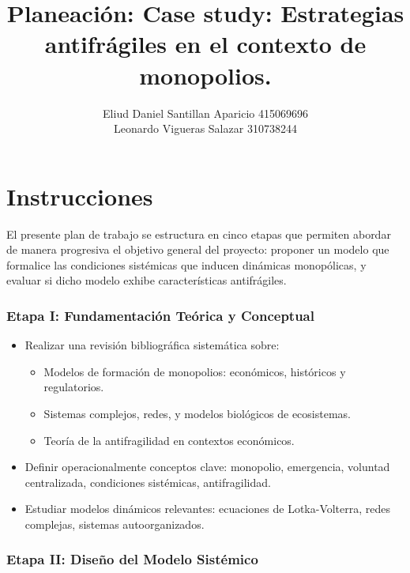 \documentclass[a4paper,12pt]{article}
\title{\textbf{Planeación:} Case study: Estrategias antifrágiles en el contexto de monopolios.}
\author{Eliud Daniel Santillan Aparicio 415069696 \\ Leonardo Vigueras Salazar 310738244}
\date{} %
\begin{document}
\maketitle
\section*{Instrucciones}

El presente plan de trabajo se estructura en cinco etapas que permiten abordar de manera progresiva el objetivo general del proyecto: proponer un modelo que formalice las condiciones sistémicas que inducen dinámicas monopólicas, y evaluar si dicho modelo exhibe características antifrágiles.

\subsubsection*{Etapa I: Fundamentación Teórica y Conceptual}

\begin{itemize}
    \item Realizar una revisión bibliográfica sistemática sobre:
    \begin{itemize}
        \item Modelos de formación de monopolios: económicos, históricos y regulatorios.
        \item Sistemas complejos, redes, y modelos biológicos de ecosistemas.
        \item Teoría de la antifragilidad en contextos económicos.
    \end{itemize}
    \item Definir operacionalmente conceptos clave: monopolio, emergencia, voluntad centralizada, condiciones sistémicas, antifragilidad.
    \item Estudiar modelos dinámicos relevantes: ecuaciones de Lotka-Volterra, redes complejas, sistemas autoorganizados.
\end{itemize}

\subsubsection*{Etapa II: Diseño del Modelo Sistémico}
\end{document}
